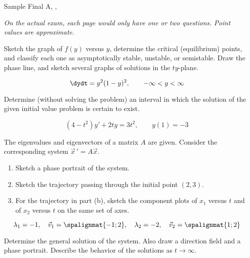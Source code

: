 \documentclass[12pt]{exam}
\newcommand{\TestName}{Sample Final A}
\begin{document}
    


\newpage
    
    \begin{center}
    {\Large \TestName, \Course, \Semester \ \Year}
    \end{center}
    
\vspace{1cm} 


\newpage 
\textit{On the actual exam, each page would only have one or two questions. Point values are approximate.} 

\begin{questions}

    \question[10] %
    Sketch the graph of $f (y)$ versus $y$, determine the critical (equilibrium) points, and classify each one as asymptotically stable, unstable, or semistable. Draw the phase line, and sketch several graphs of solutions in the $ty$-plane.

    $$\dydt = y^2(1-y)^2, \qquad -\infty < y < \infty$$

    \question[2] %
    Determine (without solving the problem) an interval in which the solution of the given initial value problem is certain to exist. 
    
    $$(4-t^2)y'+2ty=3t^2, \qquad y(1) = -3$$


    
    \question[5] %
    The eigenvalues and eigenvectors of a matrix $A$ are given. Consider the corresponding system $\vec x \, ' = A \vec x$. 
    \begin{enumerate}[label=(\alph*)]
        \item Sketch a phase portrait of the system.
        \item Sketch the trajectory passing through the initial point $(2, 3)$.
        \item For the trajectory in part (b), sketch the component plots of $x_1$ versus $t$ and of $x_2$ versus $t$ on the same set of axes.
    \end{enumerate}

    $$\lambda_1 = -1, \quad \vec v_1 = \spalignmat{-1;2}, \quad \lambda_2 = -2, \quad \vec v_2 = \spalignmat{1;2}$$
    

    \question[10] %
    Determine the general solution of the system. Also draw a direction field and a phase portrait. Describe the behavior of the solutions as $t \to \infty$.
    

\end{questions}
\end{document}
